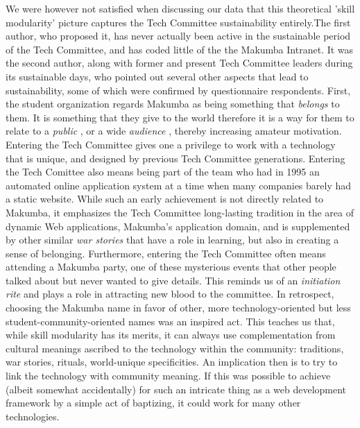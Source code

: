 \documentclass{sig-alt-release2}
\begin{document}
We were however not satisfied when discussing our data that this theoretical 'skill modularity' picture captures the Tech Committee sustainability entirely.The first author, who proposed it, has never actually been active in the sustainable period of the Tech Committee, and has coded little of the the Makumba Intranet. It was the second author, along with former and present Tech Committee leaders during its sustainable days, who pointed out  several other aspects that lead to sustainability, some of which were confirmed by questionnaire respondents. First, the student organization regards Makumba as being something that \textit{belongs} to them. It is something that they give to the world therefore it is a way for them to relate to a \textit{public} \cite{stebbins79}, or a wide \textit{audience} \cite{bogdan03}, thereby increasing amateur motivation. Entering the Tech Committee gives one a privilege to work with a technology that is unique, and designed by previous Tech Committee generations. Entering the Tech Comittee also means being part of the team who had in 1995 an automated online application system at a time when many companies barely had a static website. While such an early achievement is not directly related to Makumba, it emphasizes the Tech Committee long-lasting tradition in the area of dynamic Web applications, Makumba's application domain, and is supplemented by other similar \textit{war stories} \cite{orr96} that have a role in learning, but also in creating a sense of belonging. Furthermore, entering the Tech Committee often means attending a Makumba party, one of these mysterious events that other people talked about but never wanted to give details. This reminds us of an \textit{initiation rite} \cite{vanGennep60} and plays a role in attracting new blood to the committee.
In retrospect, choosing the Makumba name in favor of other, more technology-oriented but less student-community-oriented names was an inspired act. This teaches us that, while skill modularity has its merits, it can always use complementation from cultural meanings ascribed to the technology within the community: traditions, war stories, rituals, world-unique specificities. An implication then is to try to link the technology with community meaning. If this was possible to achieve (albeit somewhat accidentally) for such an intricate thing as a web development framework by a simple act of baptizing, it could work for many other technologies.
\end{document}
